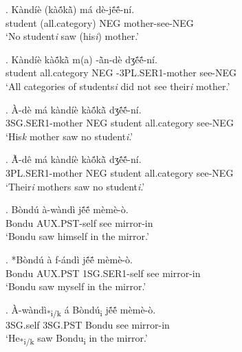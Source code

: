 \documentclass{assets/fieldnotes}
\begin{document}
\exg. K\`{a}nd\'{i}\`{e} (k\`{a}ṍkã̀)  m\'{a} d\`{e}-jẽ́ẽ́-n\'{i}. \\
student (all.category) NEG mother-see-NEG \\
`No student\textit{\scriptsize{i}} saw (his\textit{\scriptsize{i}}) mother.' 

\exg. K\`{a}nd\'{i}\`{e} k\`{a}ṍkã̀ m(a) -ã̀n-d\`{e} dʒẽ́ẽ́-n\'{i}. \\
student all.category NEG -3PL.SER1-mother see-NEG \\
`All categories of students\textit{\scriptsize{i}} did not see their\textit{\scriptsize{i}} mother.'  

\exg. \`{A}-d\`{e} m\'{a} k\`{a}nd\'{i}\`{e} k\`{a}ṍkã̀  dʒẽ́ẽ́-n\'{i}. \\
3SG.SER1-mother NEG student all.category see-NEG \\
`His\textit{\scriptsize{k}} mother saw no student\textit{\scriptsize{i}}.'

\exg. Ã̀-d\^{e} m\'{a} k\`{a}nd\'{i}\`{e} k\`{a}ṍkã̀  dʒẽ́ẽ́-n\'{i}. \\
3PL.SER1-mother NEG student all.category see-NEG \\
`Their\textit{\scriptsize{i}} mothers saw no student\textit{\scriptsize{i}}.'

 \newline


\exg. B\`{o}nd\'{u} \`{a}-w\`{a}nd\`{i} jẽ́ẽ́ m\`{e}m\`{e}-\`{o}. \\
Bondu AUX.PST-self see mirror-in \\
`Bondu saw himself in the mirror.'

\exg. *B\`{o}nd\'{u} \`{a} f-\'{a}nd\`{i} jẽ́ẽ́ m\`{e}m\`{e}-\`{o}. \\
Bondu AUX.PST 1SG.SER1-self see mirror-in \\
`Bondu saw myself in the mirror.'  

\exg. \`{A}-w\`{a}nd\`{i}\textsubscript{*i/k} \'{a} B\`{o}nd\'{u}\textsubscript{i} jẽ́ẽ́ m\`{e}m\`{e}-\`{o}. \\
3SG.self 3SG.PST Bondu see mirror-in \\
`He\textsubscript{*i/k} saw Bondu\textsubscript{i} in the mirror.' 
\end{document}
